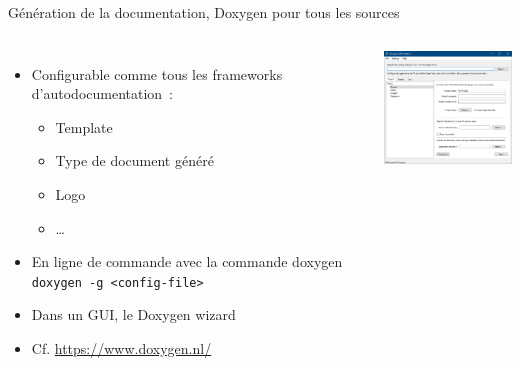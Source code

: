\documentclass{beamer}
\begin{document}
    \begin{frame}{Génération de la documentation, Doxygen pour tous les sources}
        \begin{columns}

            \begin{itemize}

                \item Configurable comme tous les frameworks d'autodocumentation~:

                \begin{itemize}
                    \item Template
                    \item Type de document généré
                    \item Logo
                    \item …
                \end{itemize}
                \item En ligne de commande avec la commande doxygen \lstinline{doxygen -g <config-file>}

                \item Dans un GUI, le Doxygen wizard
                \item Cf. \url{https://www.doxygen.nl/}

            \end{itemize}


            \centering
            \includegraphics[width=5cm]{image/doxygen-configuration-hmi}

        \end{columns}

    \end{frame}
\end{document}
